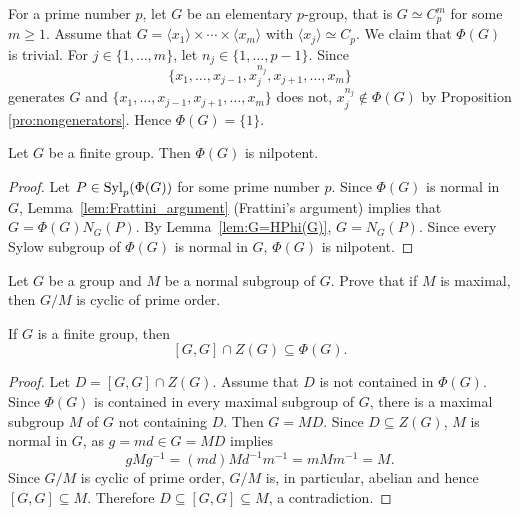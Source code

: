 \begin{example}
For a prime number $p$, let $G$ be an elementary $p$-group, that is 
$G\simeq C_p^m$ for some $m\geq1$. Assume that 
	$G=\langle x_1\rangle\times\cdots\times\langle x_m\rangle$ with $\langle x_j\rangle\simeq C_p$.  
	We claim that $\Phi(G)$ is trivial. 
	For $j\in\{1,\dots,m\}$, let $n_j\in\{1,\dots,p-1\}$. Since 
	\[
	\{x_1,\dots,x_{j-1},x_j^{n_j},x_{j+1},\dots,x_m\}
	\]
	generates $G$ and $\{x_1,\dots,x_{j-1},x_{j+1},\dots,x_m\}$ does not, 
	$x_j^{n_j}\not\in\Phi(G)$ by Proposition \ref{pro:nongenerators}. 
	Hence $\Phi(G)=\{1\}$.
\end{example}

\begin{theorem}[Frattini]
\label{thm:Frattini}
Let $G$ be a finite group. Then $\Phi(G)$ is nilpotent.
\end{theorem}

\begin{proof}
Let $P\in\mathrm{Syl}_p(\Phi(G))$ for some prime number $p$. Since $\Phi(G)$ is normal in 
$G$, Lemma~\ref{lem:Frattini_argument} (Frattini's argument) implies that 
$G=\Phi(G)N_G(P)$. By Lemma~\ref{lem:G=HPhi(G)},
$G=N_G(P)$. Since every Sylow subgroup of $\Phi(G)$ is normal in $G$,
$\Phi(G)$ is nilpotent. 
\end{proof}

\begin{exercise}
\label{xca:G/M}
Let $G$ be a group and $M$ be a normal subgroup of $G$. Prove that if  
$M$ is maximal, then 
$G/M$ is cyclic of prime order. 
\end{exercise}


\begin{theorem}
	\label{thm:Gaschutz}
	If $G$ is a finite group, then 
	\[
	[G,G]\cap Z(G)\subseteq\Phi(G).
	\]
\end{theorem}

\begin{proof}
Let $D=[G,G]\cap Z(G)$. Assume that $D$ is not contained in $\Phi(G)$.
Since $\Phi(G)$ is contained in every maximal subgroup of $G$, 
there is a maximal subgroup $M$ of $G$ not containing $D$. Then
$G=MD$. Since $D\subseteq Z(G)$, $M$ is normal in $G$, as 
	$g=md\in G=MD$ implies 
	\[
		gMg^{-1}=(md)Md^{-1}m^{-1}=mMm^{-1}=M.
	\]
	Since $G/M$ is cyclic of prime order, 
	$G/M$ is, in particular, abelian and hence $[G,G]\subseteq M$. Therefore 
	$D\subseteq [G,G]\subseteq M$, a contradiction.
\end{proof}

